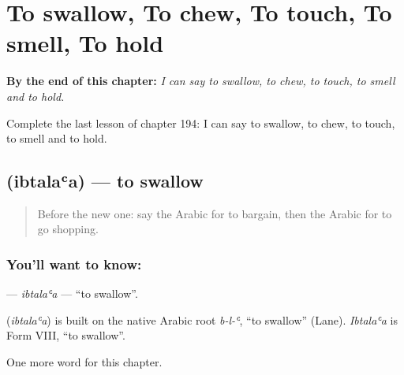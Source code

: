 
\chapter{To swallow, To chew, To touch, To smell, To hold}
\label{ch:ar-to-swallow-to-chew-to-touch-to-smell-to-hold}

\begin{chapteropening}
\textbf{By the end of this chapter:} \emph{I can say to swallow, to chew, to touch, to smell and to hold.}

Complete the last lesson of chapter 194: I can say to swallow, to chew, to touch, to smell and to hold.
\end{chapteropening}

\section[\texorpdfstring{\ar{ابتلع} (ibtalaʿa)}{ابتلع (ibtalaʿa)}]{ (ibtalaʿa) — to swallow}

\label{lesson:AR-C194-ibtalaa}



\begin{quote}
Before the new one: say the Arabic for to bargain, then the Arabic for to go shopping.
\end{quote}

\subsection*{You'll want to know: }
\textbf{} — \emph{ibtalaʿa} — \textquotedblleft{}to swallow\textquotedblright{}.

\begin{cousinweb}
\textbf{} (\emph{ibtalaʿa}) is built on the native Arabic root \emph{b-l-ʿ}, \textquotedblleft{}to swallow\textquotedblright{} (Lane). \emph{Ibtalaʿa} is Form VIII, \textquotedblleft{}to swallow\textquotedblright{}.
\end{cousinweb}

\begin{grammarlens}[title={What you've built}]
One more word for this chapter.
\end{grammarlens}

